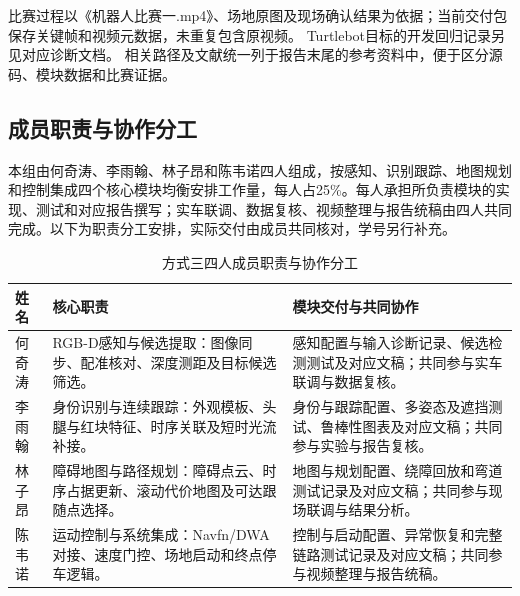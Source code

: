 比赛过程以《机器人比赛一.mp4》、场地原图及现场确认结果为依据；当前交付包保存关键帧和视频元数据，未重复包含原视频。\cite{f3-race} Turtlebot目标的开发回归记录另见对应诊断文档。\cite{f3-turtlebot} 相关路径及文献统一列于报告末尾的参考资料中，便于区分源码、模块数据和比赛证据。



\FloatBarrier


\subsection{成员职责与协作分工}

本组由何奇涛、李雨翰、林子昂和陈韦诺四人组成，按感知、识别跟踪、地图规划和控制集成四个核心模块均衡安排工作量，每人占25\%。每人承担所负责模块的实现、测试和对应报告撰写；实车联调、数据复核、视频整理与报告统稿由四人共同完成。以下为职责分工安排，实际交付由成员共同核对，学号另行补充。
\begin{table}[!htbp]\centering\small
\caption{方式三四人成员职责与协作分工}\label{tab:f3-members}
\begin{tabularx}{\linewidth}{p{18mm}YY}\toprule
姓名 & 核心职责 & 模块交付与共同协作\\\midrule
何奇涛 & RGB-D感知与候选提取：图像同步、配准核对、深度测距及目标候选筛选。 & 感知配置与输入诊断记录、候选检测测试及对应文稿；共同参与实车联调与数据复核。\\
李雨翰 & 身份识别与连续跟踪：外观模板、头腿与红块特征、时序关联及短时光流补接。 & 身份与跟踪配置、多姿态及遮挡测试、鲁棒性图表及对应文稿；共同参与实验与报告复核。\\
林子昂 & 障碍地图与路径规划：障碍点云、时序占据更新、滚动代价地图及可达跟随点选择。 & 地图与规划配置、绕障回放和弯道测试记录及对应文稿；共同参与现场联调与结果分析。\\
陈韦诺 & 运动控制与系统集成：Navfn/DWA对接、速度门控、场地启动和终点停车逻辑。 & 控制与启动配置、异常恢复和完整链路测试记录及对应文稿；共同参与视频整理与报告统稿。\\\bottomrule
\end{tabularx}\end{table}

\FloatBarrier

\endgroup
